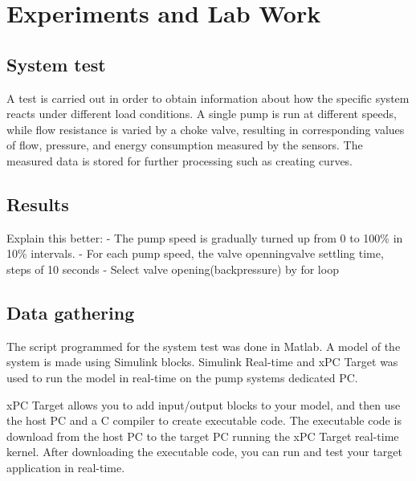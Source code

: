 \chapter{Experiments and Lab Work}\label{ch:experiment} 
\section{System test}\label{sec:system_test} 
A test is carried out in order to obtain information about how the specific 
system reacts under different load conditions. A single pump is run 
at different speeds, while flow resistance is varied by a choke valve, resulting 
in corresponding values of flow, pressure, and energy consumption measured by 
the sensors. The measured data is stored for further processing such as creating 
curves.

\section{Results}\label{sec:results}
Explain this better:\newline
- The pump speed is gradually turned up from 0 to 100\% in 10\% intervals. \newline
- For each pump speed, the valve openningvalve settling time, steps of 10 seconds\newline
- Select valve opening(backpressure) by for loop\newline



\section{Data gathering}\label{sec:data_gathering}
The script programmed for the system test was done in Matlab. 
A model of the system is made using Simulink blocks. 
Simulink Real-time and xPC Target was used to run the model in real-time on 
the pump systems dedicated PC. 




xPC Target allows you to add input/output blocks to your model, and then use the host 
PC and a C compiler to create executable code. The executable code is download 
from the host PC to the target PC running the xPC Target real-time kernel. 
After downloading the executable code, you can run and test your target 
application in real-time. 

